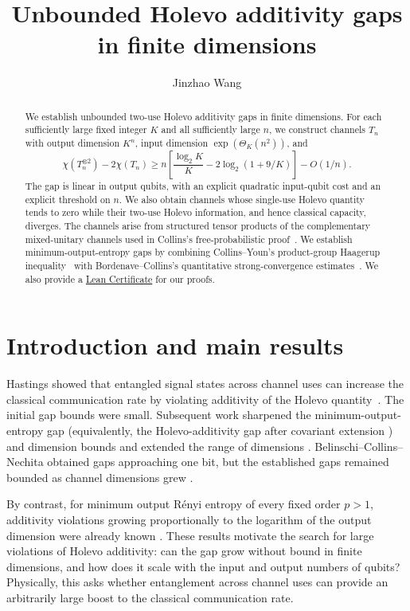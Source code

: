 \documentclass[11pt]{article}
\title{Unbounded Holevo additivity gaps in finite dimensions}
\author{Jinzhao Wang}
\date{}
\numberwithin{equation}{section}
\theoremstyle{boldremark}\newtheorem{remark}[theorem]{Remark}
\begin{document}
\maketitle
\begin{abstract}
We establish unbounded two-use Holevo additivity gaps in finite dimensions.
For each sufficiently large fixed integer $K$ and all sufficiently large
$n$, we construct channels $T_n$ with output dimension $K^n$, input dimension
$\exp(\Theta_K(n^2))$, and
\[
 \chi(T_n^{\otimes2})-2\chi(T_n)
 \ge n\left[\frac{\log_2K}{K}-2\log_2(1+9/K)\right]-O(1/n).
\]
The gap is linear in output qubits, with an explicit quadratic
input-qubit cost and an explicit threshold on $n$. We also obtain channels
whose single-use Holevo
quantity tends to zero while their two-use Holevo information, and hence
classical capacity, diverges. The channels arise from structured tensor
products of the complementary mixed-unitary channels used in Collins's
free-probabilistic proof~\cite{Collins}. We establish minimum-output-entropy
gaps by combining Collins--Youn's product-group Haagerup inequality~\cite{CY}
with Bordenave--Collins's quantitative strong-convergence estimates~\cite{BC}. We also provide a \href{https://github.com/JWang226/Holevo-Additivity-Gap}{Lean Certificate} for our proofs.
\end{abstract}

\section{Introduction and main results}\label{sec:introduction}

Hastings showed that entangled signal states across channel uses can
increase the classical communication rate by violating additivity of the
Holevo quantity~\cite{Hastings}. The initial gap bounds were small.
Subsequent work sharpened the minimum-output-entropy gap
(equivalently, the Holevo-additivity gap after covariant extension
\cite{Shor})
and dimension bounds \cite{FKM,FK} and extended the range of dimensions
\cite{ASW11,Fukuda}. Belinschi--Collins--Nechita \cite{BCN} obtained gaps
approaching one bit, but the established gaps remained bounded as
channel dimensions grew \cite{HP}.

By contrast, for minimum output R\'enyi entropy of every fixed order
$p>1$, additivity violations growing proportionally to the logarithm of
the output dimension were already known \cite{HW}. These results
motivate the search for large violations of Holevo additivity: can the
gap grow without bound in finite dimensions, and how does it scale with
the input and output numbers of qubits? Physically, this asks whether
entanglement across channel uses can provide an arbitrarily large boost
to the classical communication rate.
\end{document}
